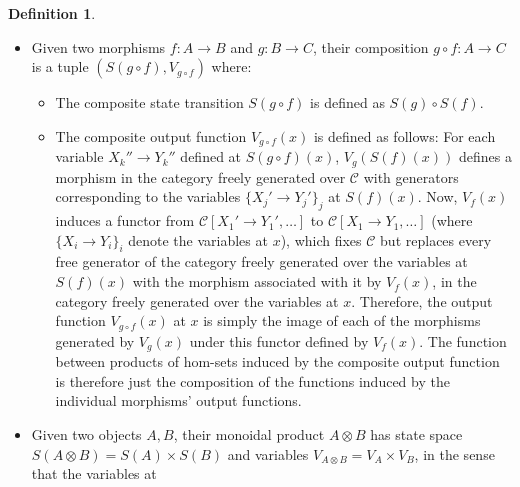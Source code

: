 \documentclass{article}
\theoremstyle{definition}
\newtheorem{definition}{Definition}[section]
\theoremstyle{remark}
\begin{document}
\begin{definition}
\begin{itemize}
\begin{itemize}
        the appropriate signature.
        \\ \\
        This induces a function between the product of
        the hom-sets $\mathrm{Hom}_{\mathcal{C}}(X_i,Y_i)$ for all
        variables $X_i\to Y_i$ at $x$ and the product of the hom-sets
        $\mathrm{Hom}_{\mathcal{C}}(X_j',Y_j')$ for all variables
        $X_j'\to Y_j'$ at $S(f)(x)$, which can be obtained by replacing
        each generator corresponding to a variable at $x$ with a 
        morphism of $\mathcal{C}$ of the appropriate signature.
    \end{itemize}
    \item Given two morphisms $f:A\to B$
    and $g:B \to C$, their composition
    $g\circ f:A\to C$ is a tuple $(S(g\circ f),V_{g \circ f})$ where:
    \begin{itemize}
        \item The composite
        state transition
        $S(g\circ f)$ is defined as $S(g) \circ S(f)$.
        \item The composite output function $V_{g\circ f}(x)$ is
        defined as follows:
        For each variable $X_k''\to Y_k''$ defined at $S(g\circ f)(x)$,
        $V_g(S(f)(x))$ defines a morphism
        in the category freely generated
        over $\mathcal{C}$ with generators corresponding to the variables
        $\{X_j'\to Y_j'\}_j$
        at $S(f)(x)$. Now, $V_f(x)$ induces a functor
        from $\mathcal{C}[X_1'\to Y_1',\dots]$ to
        $\mathcal{C}[X_1\to Y_1,\dots]$ (where $\{X_i\to Y_i\}_i$ denote
        the variables at $x$), which fixes
        $\mathcal{C}$ but replaces every free generator of the category
        freely generated over the variables at $S(f)(x)$ with the
        morphism associated with it
        by $V_f(x)$,
        in the category freely generated over the variables
        at $x$. Therefore, the output function $V_{g\circ f}(x)$ at
        $x$ is simply the image of each of the morphisms generated
        by $V_g(x)$ under this functor defined by $V_f(x)$. The function
        between products of
        hom-sets induced by the composite output function is
        therefore just the composition of the functions induced by the
        individual morphisms' output functions.
    \end{itemize}
    \item Given two objects $A,B$, their monoidal
    product $A\otimes B$ has state space $S(A\otimes B)=
    S(A)\times S(B)$ and variables $V_{A\otimes B} = 
    V_A \times V_B$, in the sense that the variables at

\end{itemize}
\end{definition}
\end{document}
